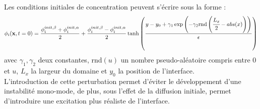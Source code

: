 Les conditions initiales de concentration peuvent s'écrire sous la forme :
\begin{equation}
\phi_{i}(\mathbf{x},t=0) = \frac{\phi^{init,\beta}_i + \phi^{init,\alpha}_i  }{2} +  \frac{\phi^{init,\beta}_i - \phi^{init,\alpha}_i }{2}\tanh\left(\frac{y-y_0+\gamma_1\exp\left(-\gamma_2 \text{rnd}\left(\cfrac{L_x}{2}-abs(x)\right)\right)}{\epsilon}\right)
\end{equation}
avec $\gamma_1, \gamma_2$ deux constantes, rnd$(u)$ un nombre pseudo-aléatoire compris entre $0$ et $u$, $L_x$ la largeur du domaine et $y_0$ la position de l'interface.\\
L'introduction de cette perturbation permet d'éviter le développement d'une instabilité mono-mode, de plus, sous l'effet de la diffusion initiale, permet d'introduire une excitation plus réaliste de l'interface.
